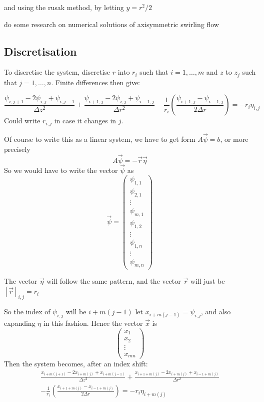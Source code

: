 \documentclass{X:/Documents/Coding/Latex/myreport}
\begin{document}
and using the rusak method, by letting $y = r^2/2$


do some research on numerical solutions of axisymmetric swirling flow 



\subsection{Discretisation}

To discretise the system, discretise $r$ into $r_i$ such that $i=1,\ldots,m$ and $z$ to $z_j$ such that $j=1,\ldots,n$.
Finite differences then give:

\[\frac{\psi_{i,j+1} - 2 \psi_{i,j} + \psi_{i,j-1}}{\Delta z^2} + \frac{\psi_{i+1,j} - 2 \psi_{i,j} + \psi_{i-1,j}}{\Delta r^2} - \frac1{r_i} \left( \frac{\psi_{i+1,j} - \psi_{i-1,j}}{2 \Delta r}\right) = - r_i \eta_{i,j}\]
Could write $r_{i,j}$ in case it changes in $j$.


Of course to write this as a linear system, we have to get form $A\vec \psi = b $, or more precisely
\[A\vec{\psi} = -\vec r\vec\eta\] 
So we would have to write the vector $\vec \psi$ as 
\[\vec \psi = \begin{pmatrix}
    \psi_{1,1}\\
    \psi_{2,1}\\
    \vdots\\
    \psi_{m,1}\\
    \psi_{1,2}\\
    \vdots\\
    \psi_{1,n}\\
    \vdots\\
    \psi_{m,n}
\end{pmatrix}\]

The vector $\vec\eta$ will follow the same pattern, and the vector $\vec r$ will just be $[\vec r]_{i,j} = r_i$


So the index of $\psi_{i,j}$ will be $i + m(j-1)$ let $x_{i+m(j-1)} = \psi_{i,j}$, and also expanding $\eta$ in this fashion.
Hence the vector $\vec x$ is
\[\begin{pmatrix}
    x_1\\
    x_2\\
    \vdots\\
    x_{mn}
\end{pmatrix}\]
Then the system becomes, after an index shift:
\begin{align*}
    \frac{x_{i+m(j+1)} - 2 x_{i+m(j)} + x_{i+m(j-1)}}{\Delta z^2} + \frac{x_{i+1+m(j)} - 2 x_{i+m(j)} + x_{i-1+m(j)}}{\Delta r^2}\\
     - \frac1{r_i} \left( \frac{x_{i+1+m(j)} - x_{i-1+m(j)}}{2 \Delta r}\right) = - r_i \eta_{i+m(j)}\\
\end{align*}
\end{document}
